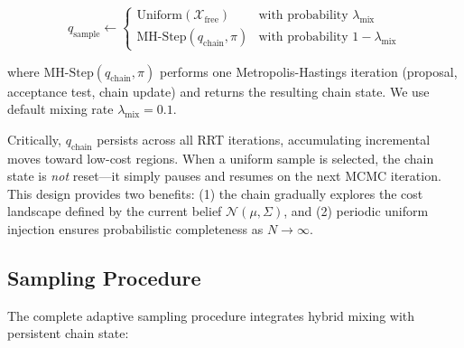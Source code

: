 \begin{equation}
    q_{\text{sample}} \leftarrow \begin{cases}
        \text{Uniform}(\mathcal{X}_{\text{free}}) & \text{with probability } \lambda_{\text{mix}} \\
        \text{MH-Step}(q_{\text{chain}}, \pi) & \text{with probability } 1 - \lambda_{\text{mix}}
    \end{cases}
\end{equation}

where $\text{MH-Step}(q_{\text{chain}}, \pi)$ performs one Metropolis-Hastings iteration (proposal, acceptance test, chain update) and returns the resulting chain state. We use default mixing rate $\lambda_{\text{mix}} = 0.1$.

Critically, $q_{\text{chain}}$ persists across all RRT iterations, accumulating incremental moves toward low-cost regions. When a uniform sample is selected, the chain state is \emph{not} reset—it simply pauses and resumes on the next MCMC iteration. This design provides two benefits: (1) the chain gradually explores the cost landscape defined by the current belief $\mathcal{N}(\mu, \Sigma)$, and (2) periodic uniform injection ensures probabilistic completeness as $N \to \infty$.

\subsection{Sampling Procedure}

The complete adaptive sampling procedure integrates hybrid mixing with persistent chain state:

\begin{algorithm}[H]
\caption{Adaptive MCMC Sampling (called at each RRT iteration)}
\label{alg:adaptive-sampling}
\DontPrintSemicolon
{}



\end{algorithm}

